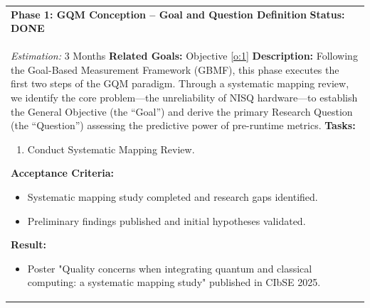\documentclass{article}
\begin{document}
\setlength{\LTleft}{0pt}
\begin{longtable}{@{}p{\textwidth}@{}}
    \toprule
    \textbf{Phase 1: GQM Conception -- Goal and Question Definition} \label{p:1} \hfill \textbf{Status: DONE} \\
    \textit{Estimation:} 3 Months \newline
    \textbf{Related Goals:} Objective \ref{o:1} \newline
    \textbf{Description:} Following the Goal-Based Measurement Framework (GBMF), this phase executes the first two steps of the GQM paradigm. Through a systematic mapping review, we identify the core problem---the unreliability of NISQ hardware---to establish the General Objective (the ``Goal'') and derive the primary Research Question (the ``Question'') assessing the predictive power of pre-runtime metrics. \newline
    \textbf{Tasks:}
    \begin{enumerate}[label=T1.\arabic*, ref=T1.\arabic*, font=\bfseries, leftmargin=3.5em, labelindent=0pt, itemindent=0pt, labelsep=0.5em, noitemsep, topsep=0pt]
        \item \label{p1:t1} Conduct Systematic Mapping Review.
    \end{enumerate}
    \textbf{Acceptance Criteria:}
    \begin{itemize}[leftmargin=1.5em, labelindent=0pt, itemindent=0pt, noitemsep, topsep=0pt]
        \item Systematic mapping study completed and research gaps identified.
        \item Preliminary findings published and initial hypotheses validated.
    \end{itemize}
    \textbf{Result:}
    \begin{itemize}[leftmargin=1.5em, labelindent=0pt, itemindent=0pt, noitemsep, topsep=0pt]
        \item Poster "Quality concerns when integrating quantum and classical computing: a systematic mapping study" published in CIbSE 2025. \cite{marquezQualityConcernsWhena_2025}
    \end{itemize} \\
    \midrule
    

\end{longtable}
\end{document}
